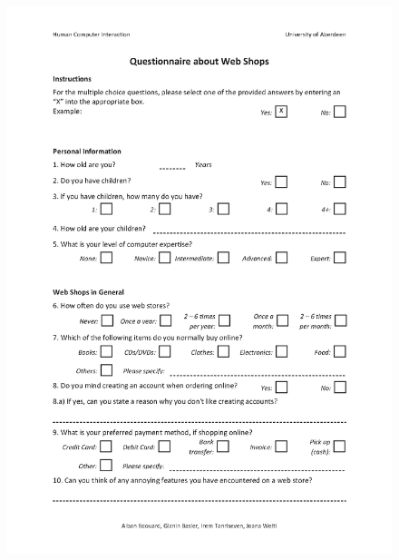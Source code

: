 \begin{figure}[h!]
\begin{center}
\includegraphics[scale=0.75]{User_Involvement_Methods/Questionnaires/Questionnaire_Web_Shops_v2_1.png}
\end{center}
\end{figure}
\newpage
